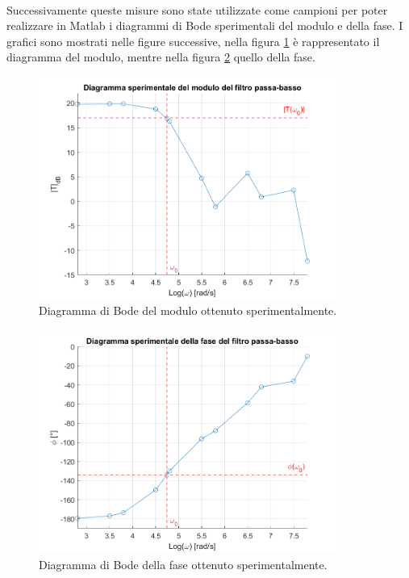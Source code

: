 \documentclass{report}
\begin{document}
\\Successivamente queste misure sono state utilizzate come campioni per poter realizzare in Matlab i diagrammi di Bode sperimentali del modulo e della fase. I grafici sono mostrati nelle figure successive, nella figura \ref{figura:modulosperimentale} è rappresentato il diagramma del modulo, mentre nella figura \ref{figura:fasesperimentale} quello della fase. \par %
\begin{figure}[h!]
	\centering
	\includegraphics[height=7.3cm]{immagini/modulo_sper}
	\caption{Diagramma di Bode del modulo ottenuto sperimentalmente.}
	\label{figura:modulosperimentale}
\end{figure}
\begin{figure}[h!]
	\centering
	\includegraphics[height=7.3cm]{immagini/fase_sper}
	\caption{Diagramma di Bode della fase ottenuto sperimentalmente.}
	\label{figura:fasesperimentale}
\end{figure}
\end{document}
